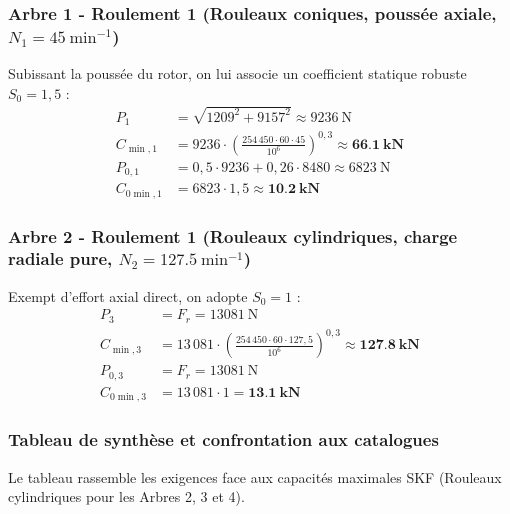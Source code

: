 \documentclass[11pt,a4paper]{article}
\begin{document}
\subsubsection*{Arbre 1 - Roulement 1 (Rouleaux coniques, poussée axiale, $N_1 = \qty{45}{\minute^{-1}}$)}
Subissant la poussée du rotor, on lui associe un coefficient statique robuste $S_0 = 1{,}5$ :
\begin{align*}
    P_1 &= \sqrt{1209^2 + 9157^2} \approx \qty{9236}{\newton} \\
    C_{\min,1} &= 9236 \cdot \left( \frac{254\,450 \cdot 60 \cdot 45}{10^6} \right)^{0{,}3} \approx \mathbf{\qty{66,1}{\kilo\newton}} \\
    P_{0,1} &= 0{,}5 \cdot 9236 + 0{,}26 \cdot 8480 \approx \qty{6823}{\newton} \\
    C_{0\min,1} &= 6823 \cdot 1{,}5 \approx \mathbf{\qty{10,2}{\kilo\newton}}
\end{align*}

\subsubsection*{Arbre 2 - Roulement 1 (Rouleaux cylindriques, charge radiale pure, $N_2 = \qty{127,5}{\minute^{-1}}$)}
Exempt d'effort axial direct, on adopte $S_0 = 1$ :
\begin{align*}
    P_3 &= F_r = \qty{13081}{\newton} \\
    C_{\min,3} &= 13\,081 \cdot \left( \frac{254\,450 \cdot 60 \cdot 127{,}5}{10^6} \right)^{0{,}3} \approx \mathbf{\qty{127,8}{\kilo\newton}} \\
    P_{0,3} &= F_r = \qty{13081}{\newton} \\
    C_{0\min,3} &= 13\,081 \cdot 1 = \mathbf{\qty{13,1}{\kilo\newton}}
\end{align*}

\subsubsection*{Tableau de synthèse et confrontation aux catalogues}
Le tableau rassemble les exigences face aux capacités maximales SKF (Rouleaux cylindriques pour les Arbres 2, 3 et 4).
\end{document}
